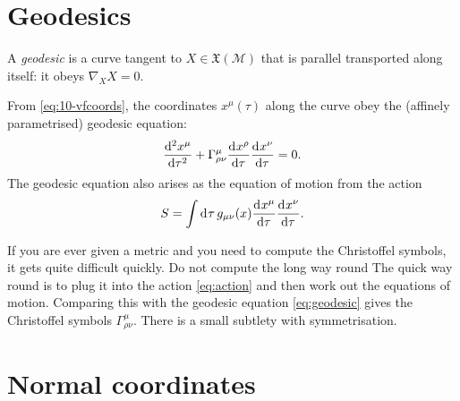 \section{Geodesics}%
\label{sec:geodesics}

\begin{definition}
  A \emph{geodesic} is a curve tangent to $X \in \mathfrak{X}(\mathcal{M})$ that is parallel transported along itself: it obeys $\nabla_{X}X = 0$.
\end{definition}
From \eqref{eq:10-vfcoords}, the coordinates $x^\mu(\tau)$ along the curve obey the (affinely parametrised) geodesic equation:
\begin{equation}
  \label{eq:geodesic}
  \dv[2]{x^\mu}{\tau} + \Gamma^\mu_{\rho\nu} \dv[]{x^\rho}{\tau} \dv[]{x^\nu}{\tau} = 0.
\end{equation}
The geodesic equation also arises as the equation of motion from the action
\begin{equation}
  \label{eq:action}
  S = \int \dd[]{\tau} g_{\mu\nu}(x) \dv[]{x^\mu}{\tau} \dv[]{x^\nu}{\tau}.
\end{equation}
\begin{leftbar}
  \begin{remark}
    If you are ever given a metric and you need to compute the Christoffel symbols, it gets quite difficult quickly. Do not compute the long way round The quick way round is to plug it into the action \eqref{eq:action} and then work out the equations of motion. Comparing this with the geodesic equation \eqref{eq:geodesic} gives the Christoffel symbols $\Gamma^\mu_{\rho\nu}$. There is a small subtlety with symmetrisation.
  \end{remark}
\end{leftbar}

\section{Normal coordinates}%
\label{sec:normal_coordinates}

